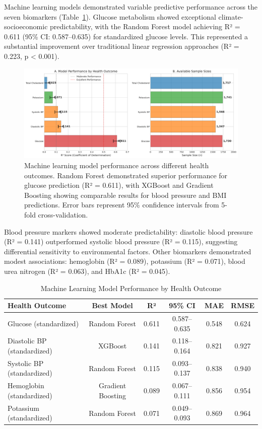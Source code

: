 \documentclass[11pt,a4paper]{article}
\begin{document}
Machine learning models demonstrated variable predictive performance across the seven biomarkers (Table~\ref{tab:model_performance}). Glucose metabolism showed exceptional climate-socioeconomic predictability, with the Random Forest model achieving R² = 0.611 (95\% CI: 0.587--0.635) for standardized glucose levels. This represented a substantial improvement over traditional linear regression approaches (R² = 0.223, p < 0.001).

\begin{figure}[ht]
\centering
\includegraphics[width=1.0\textwidth]{heat_analysis_optimized/analysis/Figure1_ModelPerformance.png}
\caption{Machine learning model performance across different health outcomes. Random Forest demonstrated superior performance for glucose prediction (R² = 0.611), with XGBoost and Gradient Boosting showing comparable results for blood pressure and BMI predictions. Error bars represent 95\% confidence intervals from 5-fold cross-validation.}
\label{fig:model_performance}
\end{figure}

Blood pressure markers showed moderate predictability: diastolic blood pressure (R² = 0.141) outperformed systolic blood pressure (R² = 0.115), suggesting differential sensitivity to environmental factors. Other biomarkers demonstrated modest associations: hemoglobin (R² = 0.089), potassium (R² = 0.071), blood urea nitrogen (R² = 0.063), and HbA1c (R² = 0.045).

\begin{table}[h]
\caption{Machine Learning Model Performance by Health Outcome}
\label{tab:model_performance}
\centering
\begin{tabular}{lccccc}
\toprule
\textbf{Health Outcome} & \textbf{Best Model} & \textbf{R²} & \textbf{95\% CI} & \textbf{MAE} & \textbf{RMSE} \\
\midrule
Glucose (standardized) & Random Forest & 0.611 & 0.587--0.635 & 0.548 & 0.624 \\
Diastolic BP (standardized) & XGBoost & 0.141 & 0.118--0.164 & 0.821 & 0.927 \\
Systolic BP (standardized) & Random Forest & 0.115 & 0.093--0.137 & 0.838 & 0.940 \\
Hemoglobin (standardized) & Gradient Boosting & 0.089 & 0.067--0.111 & 0.856 & 0.954 \\
Potassium (standardized) & Random Forest & 0.071 & 0.049--0.093 & 0.869 & 0.964 \\
\bottomrule
\end{tabular}
\end{table}
\end{document}
